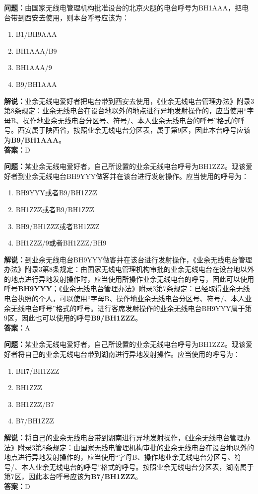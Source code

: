 \documentclass{ctexbook}
\begin{document}
\bigskip


\noindent\textbf{问题：}由国家无线电管理机构批准设台的北京火腿的电台呼号为BH1AAA，把电台带到西安去使用，则本台呼号应该为：
\begin{enumerate}[label=\Alph*), leftmargin=3em]
	\item B1/BH9AAA
	\item BH1AAA/B9
	\item BH1AAA/9
	\item B9/BH1AAA
\end{enumerate}
\noindent\textbf{解说：}业余无线电爱好者把电台带到西安去使用，《业余无线电台管理办法》附录3第8条规定：业余无线电台在设台地以外的地点进行异地发射操作的，应当使用“字母B、操作地业余无线电台分区号、符号/、本人业余无线电台的呼号”格式的呼号。西安属于陕西省，按照业余无线电台分区表，属于第9区，因此本台呼号应该为\textbf{B9/BH1AAA}。\\\noindent\textbf{答案：}D



\bigskip


\noindent\textbf{问题：}某业余无线电爱好者，自己所设置的业余无线电台呼号为BH1ZZZ。现该爱好者到业余无线电台BH9YYY做客并在该台进行发射操作。应当使用的呼号为：
\begin{enumerate}[label=\Alph*), leftmargin=3em]
	\item BH9YYY或者B9/BH1ZZZ
	\item BH1ZZZ或者B9/BH1ZZZ
	\item BH9/BH1ZZZ或者BH1ZZZ
	\item BH1ZZZ/9或者BH1ZZZ/BH9
\end{enumerate}
\noindent\textbf{解说：}到业余无线电台BH9YYY做客并在该台进行发射操作，《业余无线电台管理办法》附录3第8条规定：由国家无线电管理机构审批的业余无线电台在设台地以外的地点进行异地发射操作时，应当使用所操作业余无线电台的呼号，因此可以使用呼号\textbf{BH9YYY}；《业余无线电台管理办法》附录3第7条规定：已经取得业余无线电台执照的个人，可以使用“字母B、操作地业余无线电台分区号、符号/、本人业余无线电台呼号”格式的呼号。进行客席发射操作的业余无线电台BH9YYY属于第9区，因此也可以使用的呼号\textbf{B9/BH1ZZZ}。\\\noindent\textbf{答案：}A


\bigskip


\noindent\textbf{问题：}某业余无线电爱好者，自己所设置的业余无线电台呼号为BH1ZZZ。现该爱好者将自己的业余无线电台带到湖南进行异地发射操作。应当使用的呼号为：
\begin{enumerate}[label=\Alph*), leftmargin=3em]
	\item BH7/BH1ZZZ
	\item BH1ZZZ
	\item BH1ZZZ/B7
	\item B7/BH1ZZZ
\end{enumerate}
\noindent\textbf{解说：}将自己的业余无线电台带到湖南进行异地发射操作，《业余无线电台管理办法》附录3第8条规定：由国家无线电管理机构审批的业余无线电台在设台地以外的地点进行异地发射操作的，应当使用“字母B、操作地业余无线电台分区号、符号/、本人业余无线电台的呼号”格式的呼号。按照业余无线电台分区表，湖南属于第7区，因此本台呼号应该为\textbf{B7/BH1ZZZ}。\\\noindent\textbf{答案：}D
\end{document}
